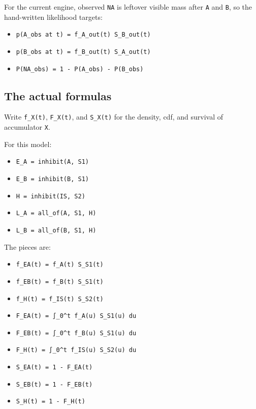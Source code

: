\documentclass[
]{article}
\providecommand{\tightlist}{%
  \setlength{\itemsep}{0pt}\setlength{\parskip}{0pt}}
\begin{document}
For the current engine, observed \texttt{NA} is leftover visible mass
after \texttt{A} and \texttt{B}, so the hand-written likelihood targets:

\begin{itemize}
\tightlist
\item
  \texttt{p(A\_obs\ at\ t)\ =\ f\_A\_out(t)\ S\_B\_out(t)}
\item
  \texttt{p(B\_obs\ at\ t)\ =\ f\_B\_out(t)\ S\_A\_out(t)}
\item
  \texttt{P(NA\_obs)\ =\ 1\ -\ P(A\_obs)\ -\ P(B\_obs)}
\end{itemize}

\subsection{The actual formulas}\label{the-actual-formulas}

Write \texttt{f\_X(t)}, \texttt{F\_X(t)}, and \texttt{S\_X(t)} for the
density, cdf, and survival of accumulator \texttt{X}.

For this model:

\begin{itemize}
\tightlist
\item
  \texttt{E\_A\ =\ inhibit(A,\ S1)}
\item
  \texttt{E\_B\ =\ inhibit(B,\ S1)}
\item
  \texttt{H\ =\ inhibit(IS,\ S2)}
\item
  \texttt{L\_A\ =\ all\_of(A,\ S1,\ H)}
\item
  \texttt{L\_B\ =\ all\_of(B,\ S1,\ H)}
\end{itemize}

The pieces are:

\begin{itemize}
\item
  \texttt{f\_EA(t)\ =\ f\_A(t)\ S\_S1(t)}
\item
  \texttt{f\_EB(t)\ =\ f\_B(t)\ S\_S1(t)}
\item
  \texttt{f\_H(t)\ =\ f\_IS(t)\ S\_S2(t)}
\item
  \texttt{F\_EA(t)\ =\ ∫\_0\^{}t\ f\_A(u)\ S\_S1(u)\ du}
\item
  \texttt{F\_EB(t)\ =\ ∫\_0\^{}t\ f\_B(u)\ S\_S1(u)\ du}
\item
  \texttt{F\_H(t)\ =\ ∫\_0\^{}t\ f\_IS(u)\ S\_S2(u)\ du}
\item
  \texttt{S\_EA(t)\ =\ 1\ -\ F\_EA(t)}
\item
  \texttt{S\_EB(t)\ =\ 1\ -\ F\_EB(t)}
\item
  \texttt{S\_H(t)\ =\ 1\ -\ F\_H(t)}
\end{itemize}
\end{document}
